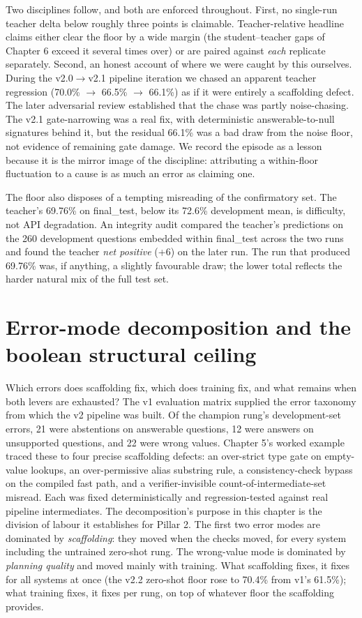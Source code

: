 \documentclass[10pt]{article} %
\begin{document}
Two disciplines follow, and both are enforced throughout. First, no single-run teacher delta below roughly three points is claimable. Teacher-relative headline claims either clear the floor by a wide margin (the student--teacher gaps of Chapter 6 exceed it several times over) or are paired against \emph{each} replicate separately. Second, an honest account of where we were caught by this ourselves. During the v2.0$\rightarrow$v2.1 pipeline iteration we chased an apparent teacher regression (70.0\% $\rightarrow$ 66.5\% $\rightarrow$ 66.1\%) as if it were entirely a scaffolding defect. The later adversarial review established that the chase was partly noise-chasing. The v2.1 gate-narrowing was a real fix, with deterministic answerable-to-null signatures behind it, but the residual 66.1\% was a bad draw from the noise floor, not evidence of remaining gate damage. We record the episode as a lesson because it is the mirror image of the discipline: attributing a within-floor fluctuation to a cause is as much an error as claiming one.

The floor also disposes of a tempting misreading of the confirmatory set. The teacher's 69.76\% on final\_test, below its 72.6\% development mean, is difficulty, not API degradation. An integrity audit compared the teacher's predictions on the 260 development questions embedded within final\_test across the two runs and found the teacher \emph{net positive} (+6) on the later run. The run that produced 69.76\% was, if anything, a slightly favourable draw; the lower total reflects the harder natural mix of the full test set.

\section{Error-mode decomposition and the boolean structural ceiling}\label{sec:error-mode-decomposition-and-the-boolean}

Which errors does scaffolding fix, which does training fix, and what remains when both levers are exhausted? The v1 evaluation matrix supplied the error taxonomy from which the v2 pipeline was built. Of the champion rung's development-set errors, 21 were abstentions on answerable questions, 12 were answers on unsupported questions, and 22 were wrong values. Chapter 5's worked example traced these to four precise scaffolding defects: an over-strict type gate on empty-value lookups, an over-permissive alias substring rule, a consistency-check bypass on the compiled fast path, and a verifier-invisible count-of-intermediate-set misread. Each was fixed deterministically and regression-tested against real pipeline intermediates. The decomposition's purpose in this chapter is the division of labour it establishes for Pillar 2. The first two error modes are dominated by \emph{scaffolding}: they moved when the checks moved, for every system including the untrained zero-shot rung. The wrong-value mode is dominated by \emph{planning quality} and moved mainly with training. What scaffolding fixes, it fixes for all systems at once (the v2.2 zero-shot floor rose to 70.4\% from v1's 61.5\%); what training fixes, it fixes per rung, on top of whatever floor the scaffolding provides.
\end{document}
